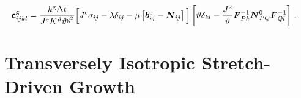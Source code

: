 \documentclass[10pt,letterpaper,oneside]{report}
\newcommand{\ten}[1]{\mbox{\boldmath $#1$}{}}
\newcommand{\tenf}[1]{\mbox{{\sffamily{\bfseries {#1}}}}}
\newcommand{\scas}[1]{\mbox{{\scriptsize{${\rm{#1}}$}}}{}}
\begin{document}
\begin{align}
\tenf{c}^{\scas{g}}_{ijkl} 
={}& \frac{k^{\scas{g}} \Delta t}{J^{\scas{e}} K^\vartheta \vartheta^{\scas{g}^2} } 
\Big[ J^{\scas{e}} \sigma_{ij} - \lambda \delta_{ij} - \mu \left[ \ten{b}^{\scas{e}}_{ij} - \ten{N}_{ij} \right] \Big] 
\left[ \vartheta \delta_{kl} - \frac{J^2}{\vartheta} \ten{F}^{-1}_{Pk} \ten{N}^0_{PQ} \ten{F}^{-1}_{Ql} \right] \, . 
\label{growth_tangent_area}
\end{align}


\section{Transversely Isotropic Stretch-Driven Growth}
\end{document}
